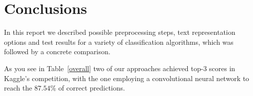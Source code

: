 \section{Conclusions}
\label{sec:conclusions}

In this report we described possible preprocessing steps, text representation options and test results for a variety of classification algorithms, which was followed by a concrete comparison.

As you see in Table~\ref{overall}
two of our approaches achieved top-$3$ scores in Kaggle's competition,
with the one employing a convolutional neural network to reach the
$87.54\%$ of correct predictions.






\begin{table}[h]
\centering
\caption{Best Performance of Classifiers}
\label{overall}
\end{table}